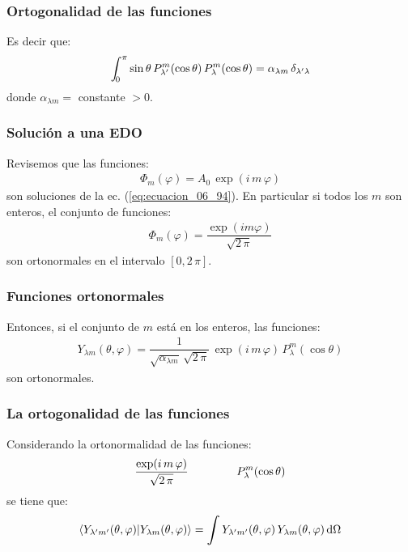 \documentclass[12pt]{beamer}
\begin{document}
\begin{frame}
\frametitle{Ortogonalidad de las funciones}
Es decir que:
\pause
\begin{align}
\scaleint{5ex}_{\bs 0}^{\pi} \sin \theta \, P_{\lambda^{\prime}}^{m} (\cos \theta) \, P_{\lambda}^{m} (\cos \theta) = \alpha_{\lambda m} \, \delta_{\lambda^{\prime} \lambda}
\label{eq:ecuacion_06_98}
\end{align}
donde $\alpha_{\lambda m} =$ constante $> 0$.
\end{frame}
\begin{frame}
\frametitle{Solución a una EDO}
Revisemos que las funciones:
\pause
\begin{align}
\Phi_{m} (\varphi) = A_{0} \, \exp(i \, m \, \varphi)
\label{eq:ecuacion_06_99}
\end{align}
\pause
son soluciones de la ec. (\ref{eq:ecuacion_06_94}). \pause En particular si todos los $m$ son enteros, el conjunto de funciones:
\pause
\begin{align}
\Phi_{m}(\varphi) = \dfrac{\exp(i m \varphi)}{\sqrt{2 \, \pi}
}
\label{eq:ecuacion_06_100}
\end{align}
son ortonormales en el intervalo $[0, 2 \, \pi]$.
\end{frame}
\begin{frame}
\frametitle{Funciones ortonormales}
Entonces, si el conjunto de $m$ está en los enteros, las funciones:
\pause
\begin{align}
Y_{\lambda m} (\theta, \varphi) = \dfrac{1}{\sqrt{\alpha_{\lambda m}} \, \sqrt{2 \, \pi}} \, \exp(i \, m \, \varphi) \, P_{\lambda}^{m} (\cos \theta)
\label{eq:ecuacion_06_101}
\end{align}
son ortonormales.
\end{frame}
\begin{frame}
\frametitle{La ortogonalidad de las funciones}
Considerando la ortonormalidad de las funciones:
\begin{align*}
\dfrac{\exp(i \, m \, \varphi)}{\sqrt{2 \, \pi}} \hspace{1.5cm} P_{\lambda}^{m} (\cos \theta)
\end{align*}
se tiene que:
\pause
\begin{align*}
\braket{Y_{\lambda^{\prime} m^{\prime}} (\theta, \varphi)}{Y_{\lambda m} (\theta, \varphi)} = \scaleint{6ex} \, Y_{\lambda^{\prime} m^{\prime}} (\theta, \varphi) \, Y_{\lambda m} (\theta, \varphi) \dd{\Omega}
\end{align*}
\end{frame}
\end{document}
